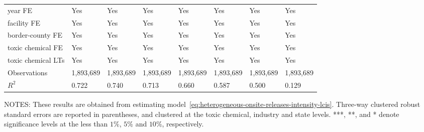 \begin{table}[H]
{\begin{tabular}{@{}llllllll@{}}
            year FE                               & Yes       & Yes           & Yes       & Yes          & Yes             & Yes           & Yes                 \\
            facility FE                           & Yes       & Yes           & Yes       & Yes          & Yes             & Yes           & Yes                 \\
            border-county FE                      & Yes       & Yes           & Yes       & Yes          & Yes             & Yes           & Yes                 \\
            toxic chemical FE                     & Yes       & Yes           & Yes       & Yes          & Yes             & Yes           & Yes                 \\
            toxic chemical LTs                    & Yes       & Yes           & Yes       & Yes          & Yes             & Yes           & Yes                 \\ \midrule
            Observations                          & 1,893,689 & 1,893,689     & 1,893,689 & 1,893,689    & 1,893,689       & 1,893,689     & 1,893,689           \\
            $R^2$                                 & 0.722     & 0.740         & 0.713     & 0.660        & 0.587           & 0.500         & 0.129               \\ \bottomrule\bottomrule
        \end{tabular}%
    }
    \begin{minipage}{\columnwidth}
        \vspace{0.05in}
        \tiny NOTES: These results are obtained from estimating model~\ref{eq:heterogeneous-onsite-releases-intensity-lcis}. Three-way clustered robust standard errors are reported in parentheses, and clustered at the toxic chemical, industry and state levels. ***, **, and * denote significance levels at the less than $1\%$, $5\%$ and $10\%$, respectively.
    \end{minipage}
\end{table}